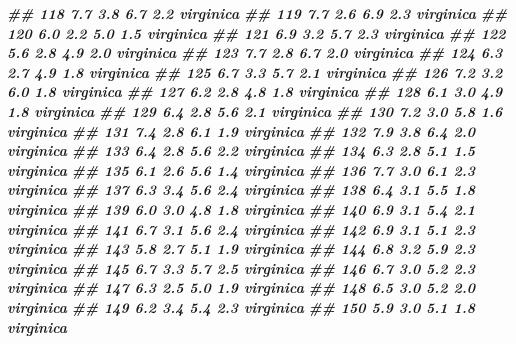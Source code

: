 \documentclass[
]{book}
\newenvironment{Shaded}{\begin{snugshade}}{\end{snugshade}}
\newcommand{\DocumentationTok}[1]{\textcolor[rgb]{0.56,0.35,0.01}{\textbf{\textit{#1}}}}
\begin{document}
\begin{Shaded}
\begin{Highlighting}[]
\DocumentationTok{\#\# 118          7.7         3.8          6.7         2.2  virginica}
\DocumentationTok{\#\# 119          7.7         2.6          6.9         2.3  virginica}
\DocumentationTok{\#\# 120          6.0         2.2          5.0         1.5  virginica}
\DocumentationTok{\#\# 121          6.9         3.2          5.7         2.3  virginica}
\DocumentationTok{\#\# 122          5.6         2.8          4.9         2.0  virginica}
\DocumentationTok{\#\# 123          7.7         2.8          6.7         2.0  virginica}
\DocumentationTok{\#\# 124          6.3         2.7          4.9         1.8  virginica}
\DocumentationTok{\#\# 125          6.7         3.3          5.7         2.1  virginica}
\DocumentationTok{\#\# 126          7.2         3.2          6.0         1.8  virginica}
\DocumentationTok{\#\# 127          6.2         2.8          4.8         1.8  virginica}
\DocumentationTok{\#\# 128          6.1         3.0          4.9         1.8  virginica}
\DocumentationTok{\#\# 129          6.4         2.8          5.6         2.1  virginica}
\DocumentationTok{\#\# 130          7.2         3.0          5.8         1.6  virginica}
\DocumentationTok{\#\# 131          7.4         2.8          6.1         1.9  virginica}
\DocumentationTok{\#\# 132          7.9         3.8          6.4         2.0  virginica}
\DocumentationTok{\#\# 133          6.4         2.8          5.6         2.2  virginica}
\DocumentationTok{\#\# 134          6.3         2.8          5.1         1.5  virginica}
\DocumentationTok{\#\# 135          6.1         2.6          5.6         1.4  virginica}
\DocumentationTok{\#\# 136          7.7         3.0          6.1         2.3  virginica}
\DocumentationTok{\#\# 137          6.3         3.4          5.6         2.4  virginica}
\DocumentationTok{\#\# 138          6.4         3.1          5.5         1.8  virginica}
\DocumentationTok{\#\# 139          6.0         3.0          4.8         1.8  virginica}
\DocumentationTok{\#\# 140          6.9         3.1          5.4         2.1  virginica}
\DocumentationTok{\#\# 141          6.7         3.1          5.6         2.4  virginica}
\DocumentationTok{\#\# 142          6.9         3.1          5.1         2.3  virginica}
\DocumentationTok{\#\# 143          5.8         2.7          5.1         1.9  virginica}
\DocumentationTok{\#\# 144          6.8         3.2          5.9         2.3  virginica}
\DocumentationTok{\#\# 145          6.7         3.3          5.7         2.5  virginica}
\DocumentationTok{\#\# 146          6.7         3.0          5.2         2.3  virginica}
\DocumentationTok{\#\# 147          6.3         2.5          5.0         1.9  virginica}
\DocumentationTok{\#\# 148          6.5         3.0          5.2         2.0  virginica}
\DocumentationTok{\#\# 149          6.2         3.4          5.4         2.3  virginica}
\DocumentationTok{\#\# 150          5.9         3.0          5.1         1.8  virginica}


\end{Highlighting}
\end{Shaded}
\end{document}

